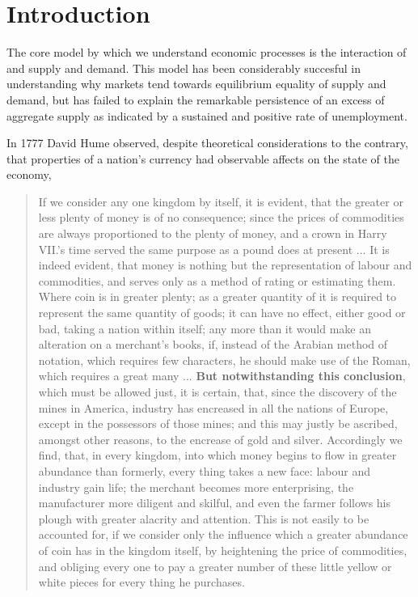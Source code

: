 
\section{Introduction}

The core model by which we understand economic processes is the interaction of and supply and
demand. This model has been considerably succesful in understanding why markets tend towards
equilibrium equality of supply and demand, but has failed to explain the remarkable persistence of
an excess of aggregate supply as indicated by a sustained and positive rate of unemployment.

In 1777 David Hume observed, despite theoretical considerations to the contrary, that properties of
a nation's currency had observable affects on the state of the economy,

\begin{quotation}
If we consider any one kingdom by itself, it is evident, that the greater or less plenty of money is
    of no consequence; since the prices of commodities are always proportioned to the plenty of
    money, and a crown in Harry VII.’s time served the same purpose as a pound does at present ...
    It is indeed evident, that money is nothing but the representation of labour and commodities,
    and serves only as a method of rating or estimating them. Where coin is in greater plenty; as a
    greater quantity of it is required to represent the same quantity of goods; it can have no
    effect, either good or bad, taking a nation within itself; any more than it would make an
    alteration on a merchant’s books, if, instead of the Arabian method of notation, which requires
    few characters, he should make use of the Roman, which requires a great many ... \textbf{But notwithstanding this conclusion}, which must be allowed just, it is certain, that, since the
    discovery of the mines in America, industry has encreased in all the nations of Europe, except
    in the possessors of those mines; and this may justly be ascribed, amongst other reasons, to the
    encrease of gold and silver.  Accordingly we find, that, in every kingdom, into which money
    begins to flow in greater abundance than formerly, every thing takes a new face: labour and
    industry gain life; the merchant becomes more enterprising, the manufacturer more diligent and
    skilful, and even the farmer follows his plough with greater alacrity and attention. This is not
    easily to be accounted for, if we consider only the influence which a greater abundance of coin
    has in the kingdom itself, by heightening the price of commodities, and obliging every one to
    pay a greater number of these little yellow or white pieces for every thing he purchases.
\end{quotation}

